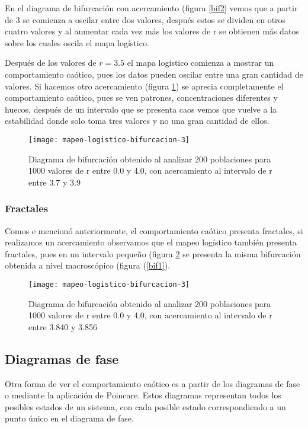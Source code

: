 En el diagrama de bifurcación con acercamiento (figura \ref{bif2} vemos que a partir de 3 se comienza a oscilar entre dos valores, después estos se dividen en otros cuatro valores y al aumentar cada vez más los valores de r se obtienen más datos sobre los cuales oscila el mapa logístico.

Después de los valores de $r=3.5$ el mapa logistico comienza a mostrar un comportamiento caótico, pues los datos pueden oscilar entre una gran cantidad de valores. Si hacemos otro acercamiento (figura \ref{bif3}) se aprecia completamente el comportamiento caótico, pues se ven patrones, concentraciones diferentes y huecos, después de un intervalo que se presenta caos vemos que vuelve a la estabilidad donde solo toma tres valores y no una gran cantidad de ellos.

\begin{figure}[ht!]
\centering
\texttt{[image: mapeo-logistico-bifurcacion-3]}
\caption{Diagrama de bifurcación obtenido al analizar 200 poblaciones para 1000 valores de r entre 0.0 y 4.0, con acercamiento al intervalo de r entre 3.7 y 3.9}
\label{bif3}
\end{figure}

\subsubsection{Fractales}
Comos e mencionó anteriormente, el comportamiento caótico presenta fractales, si realizamos un acercamiento observamos que el mapeo logístico también presenta fractales, pues en un intervalo pequeño (figura \ref{bif4} se presenta la misma bifurcación obtenida a nivel macroscópico (figura (\ref{bif1}).

\begin{figure}[ht!]
\centering
\texttt{[image: mapeo-logistico-bifurcacion-3]}
\caption{Diagrama de bifurcación obtenido al analizar 200 poblaciones para 1000 valores de r entre 0.0 y 4.0, con acercamiento al intervalo de r entre 3.840 y 3.856}
\label{bif4}
\end{figure}

\subsection{Diagramas de fase}
\noindent Otra forma de ver el comportamiento caótico es a partir de los diagramas de fase o mediante la aplicación de Poincare. Estos diagramas representan todos los posibles estados de un sistema, con cada posible estado correspondiendo a un punto único en el diagrama de fase.\cite{pcre}

